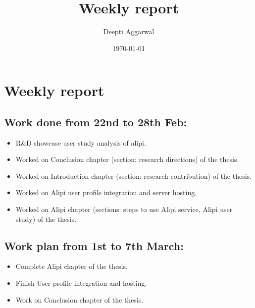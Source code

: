 \documentclass[11pt]{article}
\title{Weekly report}
\author{Deepti Aggarwal}
\date{\today}
\begin{document}
\maketitle

\setcounter{tocdepth}{3}
\vspace*{1cm}
\section{Weekly report}
\label{sec-1}

\subsection{Work done from 22nd to 28th Feb:}
\label{sec-1-1}
\begin{itemize}
\item R\&D showcase user study analysis of alipi.
\item Worked on Conclusion chapter  (section: research directions) of the thesis. 
\item Worked on Introduction chapter (section: research contribution) of the thesis. 
\item Worked on Alipi user profile integration and server hosting.
\item Worked on Alipi chapter (sections: steps to use Alipi service, Alipi user study) of the thesis.
\end{itemize}

\subsection{Work plan from 1st to 7th March:}
\label{sec-1-1}
\begin{itemize}
\item Complete Alipi chapter of the thesis.
\item Finish User profile integration and hosting.
\item Work on Conclusion chapter of the thesis.
\end{itemize}
\end{document}
